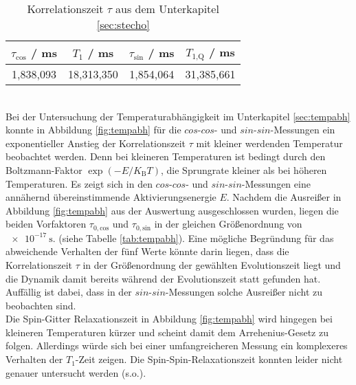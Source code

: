 \begin{table}
  \centering
  \caption{Korrelationszeit $\tau$ aus dem Unterkapitel \ref{sec:stecho}}
  \label{tab:tau}
  \begin{tabular}{S S S S}
    \toprule
    {$\tau_{\text{cos}}$ / ms} & {$T_1$ / ms} & {$\tau_{\text{sin}}$ / ms} & {$T_{1\text{,Q}}$ / ms}\\
    \midrule
    {1,838,093} & {18,313,350} & {1,854,064} & {31,385,661}\\
    \bottomrule
  \end{tabular}
\end{table}
\noindent
\\
Bei der Untersuchung der Temperaturabhängigkeit im Unterkapitel \ref{sec:tempabh}
konnte in Abbildung \ref{fig:tempabh} für die $cos$-$cos$- und $sin$-$sin$-Messungen
ein exponentieller Anstieg der Korrelationszeit $\tau$ mit kleiner werdenden Temperatur
beobachtet werden. Denn bei kleineren Temperaturen ist bedingt durch den
Boltzmann-Faktor $\exp{(-E/K_{\text{B}}T)}$, die Sprungrate kleiner als bei
höheren Temperaturen. Es zeigt sich in den $cos$-$cos$- und $sin$-$sin$-Messungen
eine annähernd übereinstimmende Aktivierungsenergie $E$.
Nachdem die Ausreißer in Abbildung \ref{fig:tempabh} aus der Auswertung ausgeschlossen
wurden, liegen die beiden Vorfaktoren $\tau_{0,\text{cos}}$ und $\tau_{0,\text{sin}}$
in der gleichen Größenordnung von $\SI{e-17}{\second}$. (siehe Tabelle \ref{tab:tempabh}).
Eine mögliche Begründung für das abweichende Verhalten der fünf Werte könnte darin liegen,
dass die Korrelationszeit $\tau$ in der Größenordnung der gewählten Evolutionszeit
liegt und die Dynamik damit bereits während der Evolutionszeit statt gefunden hat.
Auffällig ist dabei, dass in der $sin$-$sin$-Messungen solche Ausreißer nicht zu
beobachten sind.\\
Die Spin-Gitter Relaxationszeit in Abbildung \ref{fig:tempabh} wird hingegen bei
kleineren Temperaturen kürzer und scheint damit dem Arrehenius-Gesetz zu folgen.
Allerdings würde sich bei einer umfangreicheren Messung ein komplexeres
Verhalten der $T_1$-Zeit zeigen.
Die Spin-Spin-Relaxationszeit konnten leider nicht genauer untersucht werden (s.o.).

